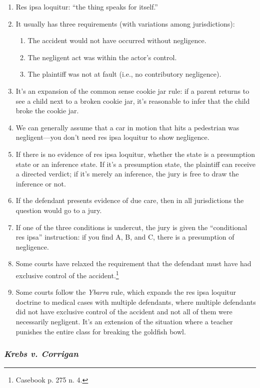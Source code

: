 \begin{enumerate}
    \item Res ipsa loquitur: ``the thing speaks for itself.''
    \item It usually has three requirements (with variations among jurisdictions):
    \begin{enumerate}
        \item The accident would not have occurred without negligence.
        \item The negligent act was within the actor's control.
        \item The plaintiff was not at fault (i.e., no contributory negligence).
    \end{enumerate}
    \item It's an expansion of the common sense cookie jar rule: if a parent returns to see a child next to a broken cookie jar, it's reasonable to infer that the child broke the cookie jar.
    \item We can generally assume that a car in motion that hits a pedestrian was negligent---you don't need res ipsa loquitur to show negligence.
    \item If there is no evidence of res ipsa loquitur, whether the state is a presumption state or an inference state. If it's a presumption state, the plaintiff can receive a directed verdict; if it's merely an inference, the jury is free to draw the inference or not.
    \item If the defendant presents evidence of due care, then in all jurisdictions the question would go to a jury.
    \item If one of the three conditions is undercut, the jury is given the ``conditional res ipsa'' instruction: if you find A, B, and C, there is a presumption of negligence.
    \item Some courts have relaxed the requirement that the defendant must have had exclusive control of the accident.\footnote{Casebook p. 275 n. 4.}
    \item Some courts follow the \emph{Ybarra} rule, which expands the res ipsa loquitur doctrine to medical cases with multiple defendants, where multiple defendants did not have exclusive control of the accident and not all of them were necessarily negligent. It's an extension of the situation where a teacher punishes the entire class for breaking the goldfish bowl.
\end{enumerate}

\subsubsection{\emph{Krebs v. Corrigan}}


